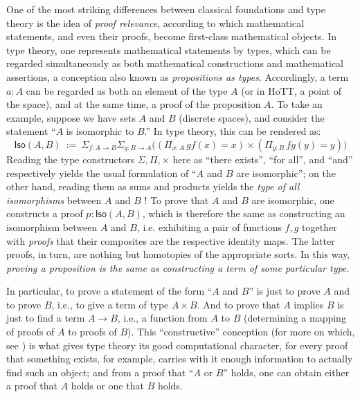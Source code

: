 {One of the most striking differences between classical foundations and type theory is the idea of \emph{proof relevance}, according to which mathematical statements, and even their proofs, become first-class mathematical objects.  In type theory, one represents mathematical statements by types, which can be regarded simultaneously as both mathematical constructions and mathematical assertions, a conception also known as \emph{propositions as types}.  Accordingly, a term $a : A$ can be regarded as both an element of the type $A$ (or in HoTT, a point of the space), and at the same time, a proof of the proposition $A$.  To take an example, suppose we have sets $A$ and $B$ (discrete spaces), and consider the statement ``$A$ is isomorphic to $B$.''  In type theory, this can be rendered as:
\[
\mathsf{Iso}(A,B)\ :=\ \Sigma_{f : A\to B}\Sigma_{g : B\to A}\big((\Pi_{x:A}\, gf(x) = x) \times (\Pi_{y:B}\, fg(y) = y)\big)
\]
%
Reading the type constructors $\Sigma, \Pi, \times$  here  as ``there exists'', ``for all'', and ``and'' respectively yields the usual formulation of ``$A$ and $B$ are isomorphic''; on the other hand, reading them as sums and products yields the \emph{type of all isomorphisms} between $A$ and $B$ !  To prove that $A$ and $B$ are isomorphic, one  constructs a proof $p : \mathsf{Iso}(A,B)$, which is therefore the same  as constructing an isomorphism between $A$ and $B$, i.e. exhibiting a pair of functions $f, g$ together with \emph{proofs} that their composites are the respective identity maps.  The latter proofs, in turn, are nothing but homotopies of the appropriate sorts.  In this way, \emph{proving a proposition is the same as constructing a term of some particular type.}

In particular, to prove a statement of the form ``$A$ and $B$'' is just to prove $A$ and to prove $B$, i.e., to give a term of type $A\times B$.  And to prove that $A$ implies $B$ is just to find a term $A\to B$, i.e., a function from $A$ to $B$ (determining a mapping of proofs of $A$ to proofs of $B$).  This ``constructive'' conception (for more on which, see \cite{kolmogorov,BHK}) is what gives type theory its good computational character, for every proof that something exists, for example, carries with it enough information to actually find such an object; and from a proof that  ``$A$ or $B$'' holds, one can obtain either a proof that $A$ holds or one that $B$ holds.  

}
